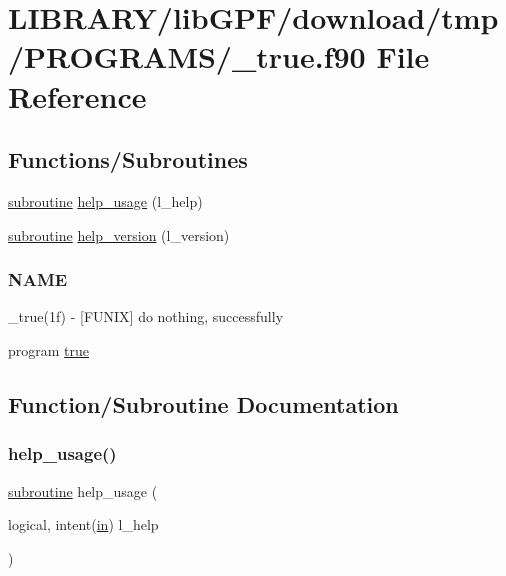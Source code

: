 \hypertarget{__true_8f90}{}\section{L\+I\+B\+R\+A\+R\+Y/lib\+G\+P\+F/download/tmp/\+P\+R\+O\+G\+R\+A\+M\+S/\+\_\+true.f90 File Reference}
\label{__true_8f90}
\subsection*{Functions/\+Subroutines}
\begin{DoxyCompactItemize}
\item 
\hyperlink{M__stopwatch_83_8txt_acfbcff50169d691ff02d4a123ed70482}{subroutine} \hyperlink{__true_8f90_a3e09a3b52ee8fb04eeb93fe5761626a8}{help\+\_\+usage} (l\+\_\+help)
\item 
\hyperlink{M__stopwatch_83_8txt_acfbcff50169d691ff02d4a123ed70482}{subroutine} \hyperlink{__true_8f90_a39c21619b08a3c22f19e2306efd7f766}{help\+\_\+version} (l\+\_\+version)
\begin{DoxyCompactList}\small\item\em \subsubsection*{N\+A\+ME}

\+\_\+true(1f) -\/ \mbox{[}F\+U\+N\+IX\mbox{]} do nothing, successfully \end{DoxyCompactList}\item 
program \hyperlink{__true_8f90_a7ed1d79677aed1b23489a4fe0bd16daa}{true}
\end{DoxyCompactItemize}


\subsection{Function/\+Subroutine Documentation}
\mbox{\label{__true_8f90_a3e09a3b52ee8fb04eeb93fe5761626a8}} 
\subsubsection{\texorpdfstring{help\+\_\+usage()}{help\_usage()}}
{\footnotesize\ttfamily \hyperlink{M__stopwatch_83_8txt_acfbcff50169d691ff02d4a123ed70482}{subroutine} help\+\_\+usage (\begin{DoxyParamCaption}\item[{logical, intent(\hyperlink{M__journal_83_8txt_afce72651d1eed785a2132bee863b2f38}{in})}]{l\+\_\+help }\end{DoxyParamCaption})}



